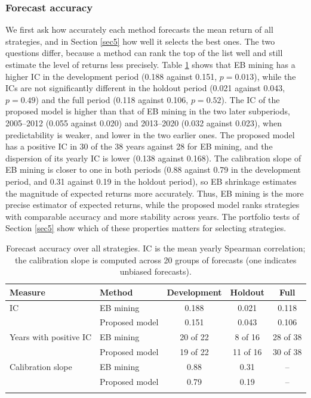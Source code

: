 \documentclass[pdflatex,sn-mathphys-num]{sn-jnl}%
\theoremstyle{thmstyleone}%
\theoremstyle{thmstyletwo}%
\theoremstyle{thmstylethree}%
\begin{document}
\subsubsection{Forecast accuracy}
We first ask how accurately each method forecasts the mean return of all strategies, and in Section \ref{sec5} how well it selects the best ones. The two questions differ, because a method can rank the top of the list well and still estimate the level of returns less precisely. Table \ref{tab:forecast} shows that EB mining has a higher IC in the development period (0.188 against 0.151, $p = 0.013$), while the ICs are not significantly different in the holdout period (0.021 against 0.043, $p = 0.49$) and the full period (0.118 against 0.106, $p = 0.52$). The IC of the proposed model is higher than that of EB mining in the two later subperiods, 2005--2012 (0.055 against 0.020) and 2013--2020 (0.032 against 0.023), when predictability is weaker, and lower in the two earlier ones. The proposed model has a positive IC in 30 of the 38 years against 28 for EB mining, and the dispersion of its yearly IC is lower (0.138 against 0.168). The calibration slope of EB mining is closer to one in both periods (0.88 against 0.79 in the development period, and 0.31 against 0.19 in the holdout period), so EB shrinkage estimates the magnitude of expected returns more accurately. Thus, EB mining is the more precise estimator of expected returns, while the proposed model ranks strategies with comparable accuracy and more stability across years. The portfolio tests of Section \ref{sec5} show which of these properties matters for selecting strategies.

\begin{table}[h]
\caption{Forecast accuracy over all strategies. IC is the mean yearly Spearman correlation; the calibration slope is computed across 20 groups of forecasts (one indicates unbiased forecasts).}\label{tab:forecast}%
\small
\begin{tabular}{@{}llccc@{}}
\toprule
Measure & Method & Development & Holdout & Full \\
\midrule
IC & EB mining & 0.188 & 0.021 & 0.118 \\
 & Proposed model & 0.151 & 0.043 & 0.106 \\
Years with positive IC & EB mining & 20 of 22 & 8 of 16 & 28 of 38 \\
 & Proposed model & 19 of 22 & 11 of 16 & 30 of 38 \\
Calibration slope & EB mining & 0.88 & 0.31 & -- \\
 & Proposed model & 0.79 & 0.19 & -- \\
\botrule
\end{tabular}
\end{table}
\end{document}
